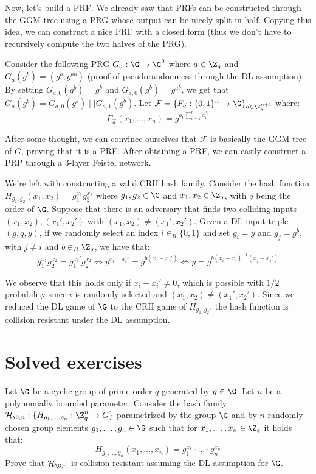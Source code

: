 \documentclass[a4paper, 12pt]{report}
\begin{document}
    Now, let's build a PRF. We already saw that PRFs can be constructed through the GGM tree using a PRG whose output can be nicely split in half. Copying this idea, we can construct a nice PRF with a closed form (thus we don't have to recursively compute the two halves of the PRG).
    
    Consider the following PRG $G_a : \G \to \G^2$ where $a \in \Z_q$ and $G_a(g^b) = (g^b, g^{ab})$ (proof of pseudorandomness through the DL assumption). By setting $G_{a,0}(g^b) = g^b$ and $G_{a,0}(g^b) = g^{ab}$, we get that $G_a(g^b) = G_{a,0}(g^b) \mid\mid G_{a,1}(g^b)$. Let $\mathcal{F} = \{F_{\vec a} : \{0,1\}^n \to \G\}_{\vec a \in \Z_q^{n+1}}$ where:
    \[F_{\vec a}(x_1, \ldots, x_n) = g^{a_0 \prod_{i = 1}^n a_i^{x_i}}\]

    After some thought, we can convince ourselves that $\mathcal{F}$ is basically the GGM tree of $G$, proving that it is a PRF. After obtaining a PRF, we can easily construct a PRP through a 3-layer Feistel network.
    
    We're left with constructing a valid CRH hash family. Consider the hash function $H_{g_1,g_2}(x_1, x_2) = g_1^{x_1}g_2^{x_2}$ where $g_1, g_2 \in \G$ and $x_1,x_2 \in \Z_q$, with $q$ being the order of $\G$. Suppose that there is an adversary that finds two colliding inputs $(x_1,x_2), (x_1',x_2')$ with $(x_1,x_2) \neq (x_1',x_2')$. Given a DL input triple $(g,q,y)$, if we randomly select an index $i \in_R \{0,1\}$ and set $g_i = y$ and $g_j = g^b$, with $j \neq i$ and $b \in_R \Z_q$, we have that:
    \[g_1^{x_1}g_2^{x_2} = g_1^{x_1'} g_2^{x_2} \iff y^{x_i-x_i'} = g^{b(x_j-x_j')} \iff y = g^{b(x_i-x_j)^{-1}(x_j-x_j')}\]

    We observe that this holds only if $x_i - x_i' \neq 0$, which is possible with $1/2$ probability since $i$ is randomly selected and $(x_1,x_2) \neq (x_1',x_2')$. Since we reduced the DL game of $\G$ to the CRH game of $H_{g_1, g_2}$, the hash function is collision resistant under the DL assumption.   

    \section{Solved exercises}

    \begin{framedprob}{}
        Let $\G$ be a cyclic group of prime order $q$ generated by $g \in \G$. Let $n$ be a polynomially bounded parameter. Consider the hash family $\mathcal{H}_{\G,n} : \{H_{g_1, \ldots, g_n} : \Z_q^n \to G\}$ parametrized by the group $\G$ and by $n$ randomly chosen group elements $g_1, \ldots, g_n \in \G$ such that for $x_1, \ldots, x_n \in \Z_q$ it holds that:
        \[H_{g_1, \ldots, g_n} (x_1, \ldots, x_n) = g_1^{x_1} \cdot \ldots \cdot g_n^{x_n}\]
        Prove that $\mathcal{H}_{\G,n}$ is collision resistant assuming the DL assumption for $\G$.
    \end{framedprob}
\end{document}
